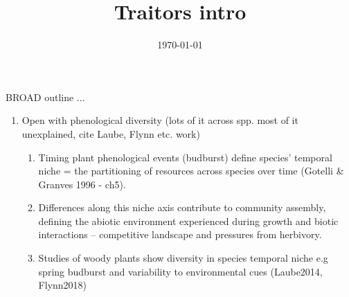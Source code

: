 \documentclass{article}
\begin{document}
\title{Traitors intro}
\date{\today}

\maketitle 

BROAD outline ... 

\begin{enumerate}

\item Open with phenological diversity (lots of it across spp. most of it unexplained, cite Laube, Flynn etc. work)
\begin{enumerate}
\item Timing plant phenological events (budburst) define species' temporal niche = the partitioning of resources across species over time (Gotelli \& Granves 1996 - ch5).
\item Differences along this niche axis contribute to community assembly, defining the abiotic environment experienced during growth and biotic interactions -- competitive landscape and pressures from herbivory.
\item Studies of woody plants show diversity in species temporal niche e.g spring budburst and variability to environmental cues (Laube2014, Flynn2018)
\end{enumerate}


\end{enumerate}
\end{document}
